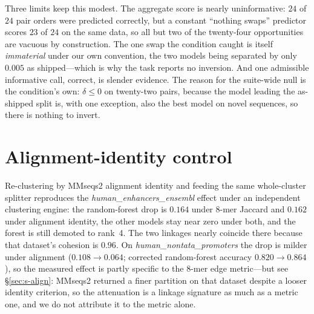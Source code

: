 \documentclass[11pt,a4paper]{article}
\begin{document}
Three limits keep this modest. The aggregate score is nearly uninformative: $24$ of $24$ pair orders
were predicted correctly, but a constant ``nothing swaps'' predictor scores $23$ of $24$ on the same
data, so all but two of the twenty-four opportunities are vacuous by construction. The one swap the
condition caught is itself \emph{immaterial} under our own convention, the two models being
separated by only $0.005$ as shipped---which is why the task reports no inversion. And one
admissible informative call, correct, is slender evidence. The reason for the suite-wide null is the
condition's own: $\delta\le0$ on twenty-two pairs, because the model leading the as-shipped split
is, with one exception, also the best model on novel sequences, so there is nothing to invert.

\section{Alignment-identity control}\label{sec:s-alignres}
Re-clustering by MMseqs2 alignment identity and feeding the same whole-cluster splitter reproduces
the \textit{human\_enhancers\_ensembl} effect under an independent clustering engine: the
random-forest drop is $0.164$ under $8$-mer Jaccard and $0.162$ under alignment identity, the other
models stay near zero under both, and the forest is still demoted to rank~4. The two linkages nearly
coincide there because that dataset's cohesion is $0.96$. On \textit{human\_nontata\_promoters} the
drop is milder under alignment ($0.108\to0.064$; corrected random-forest accuracy
$0.820\to0.864$), so the measured effect is partly specific to the $8$-mer edge metric---but see
\S\ref{sec:s-align}: MMseqs2 returned a finer partition on that dataset despite a looser identity
criterion, so the attenuation is a linkage signature as much as a metric one, and we do not
attribute it to the metric alone.
\end{document}
